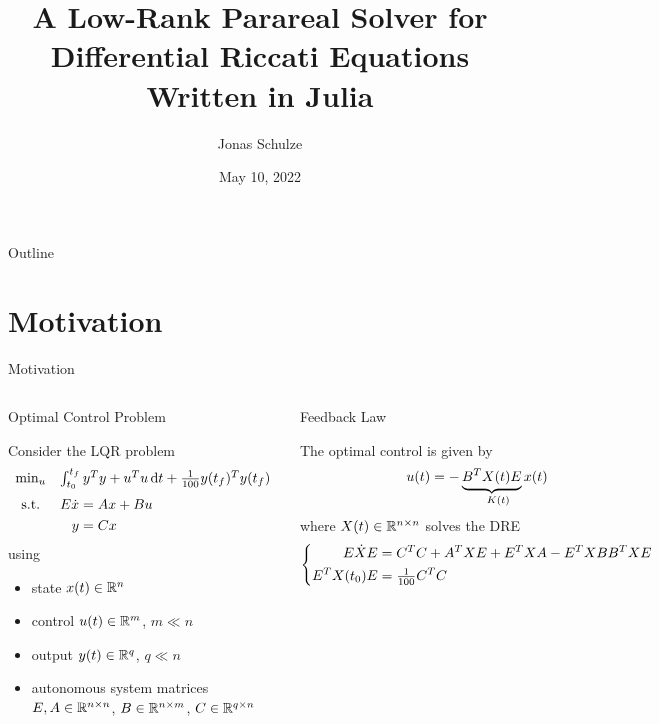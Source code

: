 \documentclass[
  aspectratio=1610,
]{beamer}
\title{A Low-Rank Parareal Solver for\\ Differential Riccati Equations\\ Written in Julia}
\author{Jonas Schulze}
\institute{Faculty of Mathematics\\ Otto-von-Guericke-Universität Magdeburg}
\date{May 10, 2022}
\newcommand\maketocframe[1][]{%
  \begin{frame}{Outline}
    \tableofcontents[#1]
  \end{frame}
}
\begin{document}
\frame[plain]{\titlepage}
\maketocframe

\section{Motivation}

\everymath{\displaystyle}

\begin{frame}{Motivation}
  \begin{columns}[t,onlytextwidth]
  \begin{block}{\strut Optimal Control Problem}
    Consider the \ac{LQR} problem
    \begin{equation*}
      \begin{array}{cl}
        \min_u & \int_{t_0}^{t_f} y^\T y + u^\T u \dt + \tfrac{1}{100} y(t_f)^\T y(t_f) \medskip\\
        \text{s.t.} & \begin{aligned}[t]
          E \dot x &= Ax + Bu \\
          y &= Cx
        \end{aligned}
      \end{array}
    \end{equation*}
    using
    \begin{itemize}
      \item
        state $x(t)\in\mathbb{R}^n$
      \item
        control $u(t)\in\mathbb{R}^m$, $m\ll n$
      \item
        output $y(t)\in\mathbb{R}^q$, $q\ll n$
      \item
        autonomous system matrices $E, A \in\mathbb{R}^{n\times n}$, $B\in\mathbb{R}^{n\times m}$, $C\in\mathbb{R}^{q\times n}$
    \end{itemize}
  \end{block}
  \begin{block}{\strut Feedback Law}
    The optimal control is given by
    \begin{equation*}
      u(t) = - \underbrace{
        B^\T X(t) E
      }_{
        K\mathrlap{(t)}
      }
      x(t)
    \end{equation*}
    where $X(t)\in\mathbb{R}^{n\times n}$ solves the \ac{DRE}
    \begin{equation*}
      \left\{
        \begin{aligned}
          E\dot X E &= C^T C + A^T X E + E^T X A - E^T X BB^T X E \\
          E^T X(t_0) E &= \tfrac{1}{100} C^T C
        \end{aligned}
      \right.
    \end{equation*}
  \end{block}
  \end{columns}
\end{frame}
\end{document}
